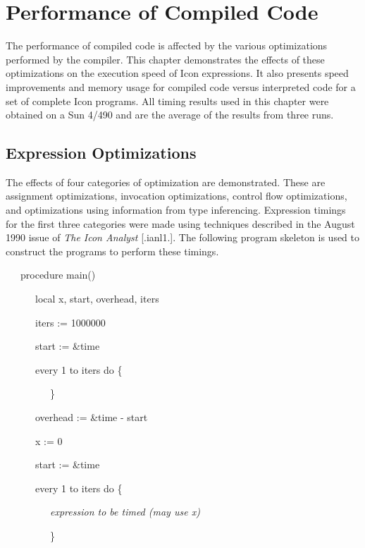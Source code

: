 \chapter{Performance of Compiled Code}

The performance of compiled code is affected by the various
optimizations performed by the compiler. This chapter demonstrates the
effects of these optimizations on the execution speed of Icon
expressions. It also presents speed improvements and memory usage for
compiled code versus interpreted code for a set of complete Icon
programs. All timing results used in this chapter were obtained on a
Sun 4/490 and are the average of the results from three runs.


\section{Expression Optimizations}

The effects of four categories of optimization are demonstrated. These
are assignment optimizations, invocation optimizations, control flow
optimizations, and optimizations using information from type
inferencing. Expression timings for the first three categories were
made using techniques described in the August 1990 issue of
\textit{The Icon Analyst} [.ianl1.]. The following program skeleton is
used to construct the programs to perform these timings.

{\ttfamily\mdseries
\ \ \ procedure main()}

{\ttfamily\mdseries
\ \ \ \ \ \ local x, start, overhead, iters}

{\ttfamily\mdseries
\ \ \ \ \ \ iters := 1000000}

{\ttfamily\mdseries
\ \ \ \ \ \ start := \&time}

{\ttfamily\mdseries
\ \ \ \ \ \ every 1 to iters do \{}

{\ttfamily\mdseries
\ \ \ \ \ \ \ \ \ \}}

{\ttfamily\mdseries
\ \ \ \ \ \ overhead := \&time - start}

{\ttfamily\mdseries
\ \ \ \ \ \ x := 0}

{\ttfamily\mdseries
\ \ \ \ \ \ start := \&time}

{\ttfamily\mdseries
\ \ \ \ \ \ every 1 to iters do \{}

{\ttfamily\mdseries
\ \ \ \ \ \ \ \ \ \textit{expression to be timed (may use x)}}

{\ttfamily\mdseries
\ \ \ \ \ \ \ \ \ \}}

